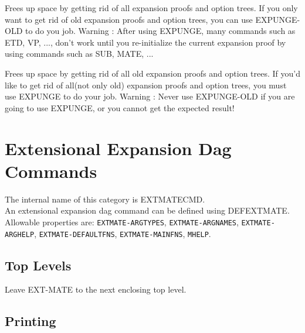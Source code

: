 \begin{description} 
\item[EXPUNGE]  
Frees up space by getting rid of all expansion proofs and option 
trees. If you only want to get rid of old expansion proofs and 
option trees, you can use EXPUNGE-OLD to do you job. 
Warning : After using EXPUNGE, many commands such as ETD, VP, ...,
don't work until you re-initialize the current expansion proof by using
commands such as SUB, MATE, ...

\item[EXPUNGE-OLD]  
Frees up space by getting rid of all old expansion proofs and 
option trees. If you'd like to get rid of all(not only old) expansion
proofs and option trees, you must use EXPUNGE to do your job.
Warning : Never use EXPUNGE-OLD if you are going to use EXPUNGE, or you
cannot get the expected result!
\item
\end{description}
\chapter{Extensional Expansion Dag Commands}
The internal name of this category is 
EXTMATECMD.\\
An extensional expansion dag command can be defined using DEFEXTMATE.
Allowable properties are: \texttt{EXTMATE-ARGTYPES}, \texttt{EXTMATE-ARGNAMES}, \texttt{EXTMATE-ARGHELP}, \texttt{EXTMATE-DEFAULTFNS}, \texttt{EXTMATE-MAINFNS}, \texttt{MHELP}.

\section{Top Levels}

\begin{description} 
\item[LEAVE]  
Leave EXT-MATE to the next enclosing top level.
\item
\end{description}

\section{Printing}

